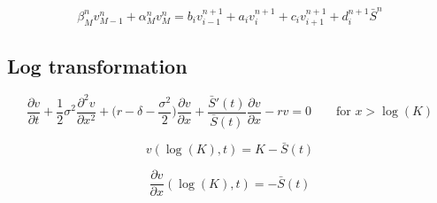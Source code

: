 \begin{equation}
    \beta^{n}_{M} v^{n}_{M-1} + \alpha^{n}_{M} v^{n}_{M} = b_i v^{n+1}_{i-1} + a_i v^{n+1}_{i} + c_i v^{n+1}_{i+1} + d^{n+1}_{i}\bar{S}^{n}
\end{equation}

\subsection{Log transformation}



\begin{equation}
    \dfrac{\partial{v}}{\partial{t}} + \dfrac{1}{2}\sigma^{2}\dfrac{\partial^{2}{v}}{\partial{x^2}} + \bigg( r - \delta - \dfrac{\sigma^2}{2} \bigg)\dfrac{\partial{v}}{\partial{x}} + \dfrac{\bar{S}'(t)}{\bar{S}(t)}\dfrac{\partial{v}}{\partial{x}} - rv = 0 \qquad \text{for $x > \log(K)$} 
\end{equation}


\begin{equation}
    v(\log(K), t) = K - \bar{S}(t) 
\end{equation}

\begin{equation}
    \dfrac{\partial{v}}{\partial{x}}(\log(K), t) = -\bar{S}(t) 
\end{equation}